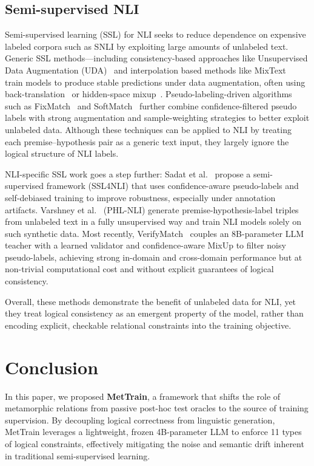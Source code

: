 \documentclass[lettersize,journal]{IEEEtran}
\begin{document}
\subsection{Semi-supervised NLI}
Semi-supervised learning (SSL) for NLI seeks to reduce dependence on expensive labeled corpora such as SNLI by exploiting large amounts of unlabeled text. Generic SSL methods—including consistency-based approaches like Unsupervised Data Augmentation (UDA)~\cite{DBLP:conf/nips/XieDHL020} and interpolation based methods like MixText~\cite{DBLP:conf/acl/ChenYY20} train models to produce stable predictions under data augmentation, often using back-translation~\cite{edunov2018understanding} or hidden-space mixup~\cite{zhang2017mixup}.  Pseudo-labeling-driven algorithms such as FixMatch~\cite{DBLP:conf/nips/SohnBCZZRCKL20} and SoftMatch~\cite{DBLP:conf/iclr/0102TFW0S0RS23} further combine confidence-filtered pseudo labels with strong augmentation and sample-weighting strategies to better exploit unlabeled data. Although these techniques can be applied to NLI by treating each premise–hypothesis pair as a generic text input, they largely ignore the logical structure of NLI labels. 

NLI-specific SSL work goes a step further: Sadat et al.~\cite{DBLP:conf/emnlp/SadatC22a} propose a semi-supervised framework (SSL4NLI) that uses confidence-aware pseudo-labels and self-debiased training to improve robustness, especially under annotation artifacts.  Varshney et al.~\cite{DBLP:conf/acl/VarshneyBGB22} (PHL-NLI) generate premise-hypothesis-label triples from unlabeled text in a fully unsupervised way and train NLI models solely on such synthetic data.  Most recently, VerifyMatch~\cite{DBLP:conf/emnlp/ParkC24} couples an 8B-parameter LLM teacher with a learned validator and confidence-aware MixUp to filter noisy pseudo-labels, achieving strong in-domain and cross-domain performance but at non-trivial computational cost and without explicit guarantees of logical consistency.  

Overall, these methods demonstrate the benefit of unlabeled data for NLI, yet they treat logical consistency as an emergent property of the model, rather than encoding explicit, checkable relational constraints into the training objective.


\section{Conclusion}

In this paper, we proposed \textbf{MetTrain}, a framework that shifts the role of metamorphic relations from passive post-hoc test oracles to the source of training supervision. By decoupling logical correctness from linguistic generation, MetTrain leverages a lightweight, frozen 4B-parameter LLM to enforce 11 types of logical constraints, effectively mitigating the noise and semantic drift inherent in traditional semi-supervised learning.
\end{document}
